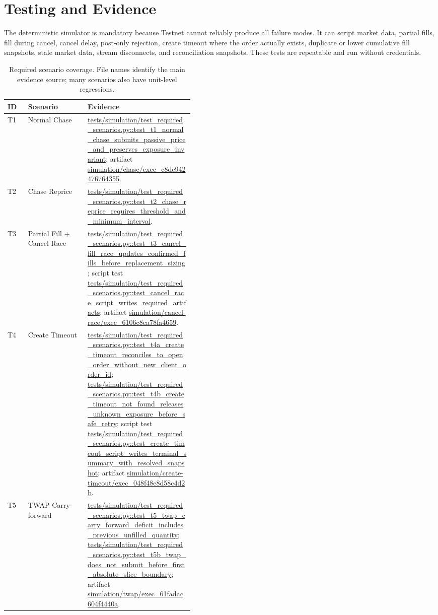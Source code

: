 \section{Testing and Evidence}

The deterministic simulator is mandatory because Testnet cannot reliably produce all failure modes. It can script market data, partial fills, fill during cancel, cancel delay, post-only rejection, create timeout where the order actually exists, duplicate or lower cumulative fill snapshots, stale market data, stream disconnects, and reconciliation snapshots. These tests are repeatable and run without credentials.

\begin{table}[htbp]
\caption{Required scenario coverage. File names identify the main evidence source; many scenarios also have unit-level regressions.}
\label{tab:test-map}
\centering
\small
\begin{tabularx}{\linewidth}{>{\raggedright\arraybackslash}p{0.11\linewidth} >{\raggedright\arraybackslash}p{0.32\linewidth} X}
\toprule
ID & Scenario & Evidence \\
\midrule
T1 & Normal Chase & \url{tests/simulation/test_required_scenarios.py::test_t1_normal_chase_submits_passive_price_and_preserves_exposure_invariant}; artifact \url{simulation/chase/exec_c8dc942476764355}. \\
T2 & Chase Reprice & \url{tests/simulation/test_required_scenarios.py::test_t2_chase_reprice_requires_threshold_and_minimum_interval}. \\
T3 & Partial Fill + Cancel Race & \url{tests/simulation/test_required_scenarios.py::test_t3_cancel_fill_race_updates_confirmed_fills_before_replacement_sizing}; script test \url{tests/simulation/test_required_scenarios.py::test_cancel_race_script_writes_required_artifacts}; artifact \url{simulation/cancel-race/exec_6106c8ca78fa4659}. \\
T4 & Create Timeout & \url{tests/simulation/test_required_scenarios.py::test_t4a_create_timeout_reconciles_to_open_order_without_new_client_order_id}; \url{tests/simulation/test_required_scenarios.py::test_t4b_create_timeout_not_found_releases_unknown_exposure_before_safe_retry}; script test \url{tests/simulation/test_required_scenarios.py::test_create_timeout_script_writes_terminal_summary_with_resolved_snapshot}; artifact \url{simulation/create-timeout/exec_048f48e8d58c4d2b}. \\
T5 & TWAP Carry-forward & \url{tests/simulation/test_required_scenarios.py::test_t5_twap_carry_forward_deficit_includes_previous_unfilled_quantity}; \url{tests/simulation/test_required_scenarios.py::test_t5b_twap_does_not_submit_before_first_absolute_slice_boundary}; artifact \url{simulation/twap/exec_61fadac604f4440a}. \\

\end{tabularx}
\end{table}
